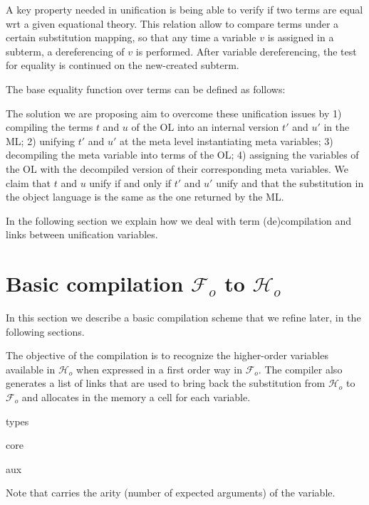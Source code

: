 \documentclass[sigconf,natbib=false,review]{acmart}
\newcommand{\Fo}{\ensuremath{\mathcal{F}_{\!o}\xspace}} %
\newcommand{\Ho}{\ensuremath{\mathcal{H}_o}\xspace}
\begin{document}
\old

A key property needed in unification is being able to verify if two terms are
equal wrt a given equational theory. This relation allow to compare terms under
a certain substitution mapping, so that any time a variable $v$ is assigned in a
subterm, a dereferencing of $v$ is performed. After variable dereferencing, the
test for equality is continued on the new-created subterm.

The base equality function over terms can be defined as follows:

The solution we are proposing aim to overcome these unification issues by 1)
compiling the terms $t$ and $u$ of the OL into an internal version $t'$ and $u'$
in the ML; 2) unifying $t'$ and $u'$ at the meta level instantiating meta
variables; 3) decompiling the meta variable into terms of the OL; 4) assigning
the variables of the OL with the decompiled version of their corresponding meta
variables. We claim that $t$ and $u$ unify if and only if $t'$ and $u'$ unify
and that the substitution in the object language is the same as the one returned
by the ML.  

In the following section we explain how we deal with term (de)compilation and
links between unification variables.

\section[Compilation: fo\_tm to tm]{Basic compilation \Fo{} to \Ho{}}
\label{sec:compilation}

In this section we describe a basic compilation scheme that we refine
later, in the following sections.

The objective of the compilation is to recognize the higher-order variables
available in \Ho{} when expressed in a first order way in \Fo{}. The compiler
also generates a list of links that are used to bring back the substitution from
\Ho{} to \Fo{} and allocates in the memory a cell for each variable.

types


core



aux



\noindent
Note that  carries the arity (number of expected arguments) of
the variable. 
\end{document}
